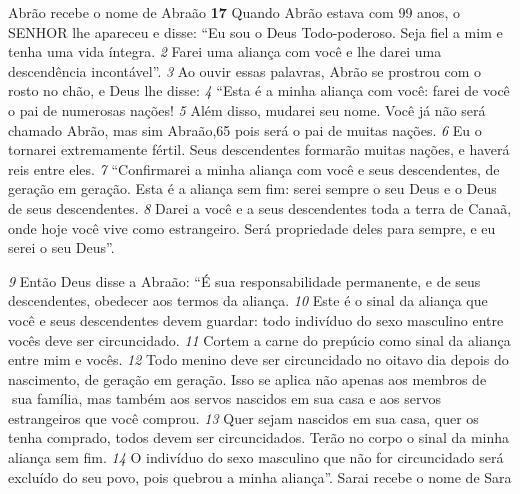 \bigskip
Abrão recebe o nome de Abraão
\textbf{\large 17}
 Quando Abrão estava com 99 anos, o SENHOR lhe apareceu e disse: “Eu sou
o Deus Todo-poderoso. Seja fiel a mim e tenha uma vida íntegra. 
\textit{\tiny 2}
Farei uma
aliança com você e lhe darei uma descendência incontável”.
\textit{\tiny 3}
Ao ouvir essas palavras, Abrão se prostrou com o rosto no chão, e Deus lhe
disse: 
\textit{\tiny 4}
“Esta é a minha aliança com você: farei de você o pai de numerosas nações!
\textit{\tiny 5}
Além disso, mudarei seu nome. Você já não será chamado Abrão, mas sim
Abraão,65 pois será o pai de muitas nações. 
\textit{\tiny 6}
Eu o tornarei extremamente fértil.
Seus descendentes formarão muitas nações, e haverá reis entre eles.
\textit{\tiny 7}
“Confirmarei a minha aliança com você e seus descendentes, de geração em
geração. Esta é a aliança sem fim: serei sempre o seu Deus e o Deus de seus
descendentes. 
\textit{\tiny 8}
Darei a você e a seus descendentes toda a terra de Canaã, onde
hoje você vive como estrangeiro. Será propriedade deles para sempre, e eu serei o
seu Deus”.

\bigskip
\textit{\tiny 9}
Então Deus disse a Abraão: “É sua responsabilidade permanente, e de seus
descendentes, obedecer aos termos da aliança. 
\textit{\tiny 10}
Este é o sinal da aliança que você
e seus descendentes devem guardar: todo indivíduo do sexo masculino entre
vocês deve ser circuncidado. 
\textit{\tiny 11}
Cortem a carne do prepúcio como sinal da aliança
entre mim e vocês. 
\textit{\tiny 12}
Todo menino deve ser circuncidado no oitavo dia depois do
nascimento, de geração em geração. Isso se aplica não apenas aos membros de
sua família, mas também aos servos nascidos em sua casa e aos servos
estrangeiros que você comprou. 
\textit{\tiny 13}
Quer sejam nascidos em sua casa, quer os
tenha comprado, todos devem ser circuncidados. Terão no corpo o sinal da minha
aliança sem fim. 
\textit{\tiny 14}
O indivíduo do sexo masculino que não for circuncidado será
excluído do seu povo, pois quebrou a minha aliança”.
Sarai recebe o nome de Sara

